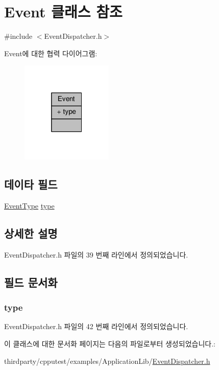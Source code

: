 \hypertarget{class_event}{}\section{Event 클래스 참조}
\label{class_event}


{\ttfamily \#include $<$Event\+Dispatcher.\+h$>$}



Event에 대한 협력 다이어그램\+:
\nopagebreak
\begin{figure}[H]
\begin{center}
\leavevmode
\includegraphics[width=124pt]{class_event__coll__graph}
\end{center}
\end{figure}
\subsection*{데이타 필드}
\begin{DoxyCompactItemize}
\item 
\hyperlink{_event_dispatcher_8h_a2628ea8d12e8b2563c32f05dc7fff6fa}{Event\+Type} \hyperlink{class_event_a2f18e60350b641236ab0e724d0622d1d}{type}
\end{DoxyCompactItemize}


\subsection{상세한 설명}


Event\+Dispatcher.\+h 파일의 39 번째 라인에서 정의되었습니다.



\subsection{필드 문서화}
\subsubsection[{\texorpdfstring{type}{type}}]{ type}\hypertarget{class_event_a2f18e60350b641236ab0e724d0622d1d}{}\label{class_event_a2f18e60350b641236ab0e724d0622d1d}


Event\+Dispatcher.\+h 파일의 42 번째 라인에서 정의되었습니다.



이 클래스에 대한 문서화 페이지는 다음의 파일로부터 생성되었습니다.\+:\begin{DoxyCompactItemize}
\item 
thirdparty/cpputest/examples/\+Application\+Lib/\hyperlink{_event_dispatcher_8h}{Event\+Dispatcher.\+h}\end{DoxyCompactItemize}
